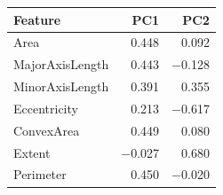 \begin{tabular}{lrr}
\toprule
Feature & PC1 & PC2 \\
\midrule
Area & 0.448 & 0.092 \\
MajorAxisLength & 0.443 & $-$0.128 \\
MinorAxisLength & 0.391 & 0.355 \\
Eccentricity & 0.213 & $-$0.617 \\
ConvexArea & 0.449 & 0.080 \\
Extent & $-$0.027 & 0.680 \\
Perimeter & 0.450 & $-$0.020 \\
\bottomrule
\end{tabular}
